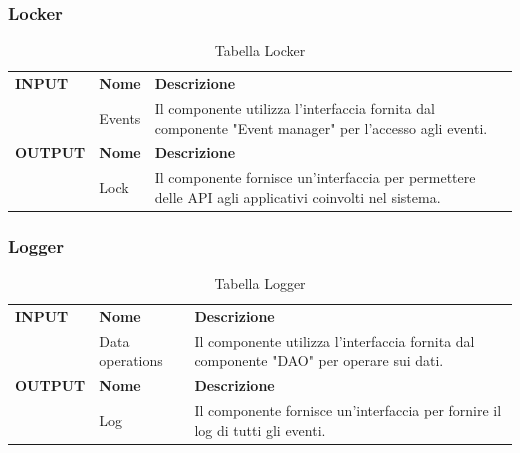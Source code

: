 \documentclass{article}
\begin{document}
\subsubsection{Locker}

\begin{table}[htbp]
    \centering
    \renewcommand{\arraystretch}{1.3} %
    \begin{tabularx}{\textwidth}{| l | l | X |}
        \Xhline{2pt}
        \textbf{INPUT} & \textbf{Nome} & \textbf{Descrizione} \\
        \Xhline{2pt}
         & Events & Il componente utilizza l'interfaccia fornita dal componente "Event manager" per l'accesso agli eventi. \\
        \Xhline{2pt}
        \textbf{OUTPUT} & \textbf{Nome} & \textbf{Descrizione} \\
        \Xhline{2pt}
         & Lock & Il componente fornisce un'interfaccia per permettere delle API agli applicativi coinvolti nel sistema. \\
        \hline
    \end{tabularx}
    \caption{Tabella Locker}
\end{table}

\clearpage

\subsubsection{Logger}

\begin{table}[htbp]
    \centering
    \renewcommand{\arraystretch}{1.3} %
    \begin{tabularx}{\textwidth}{| l | l | X |}
        \Xhline{2pt}
        \textbf{INPUT} & \textbf{Nome} & \textbf{Descrizione} \\
        \Xhline{2pt}
         & Data operations & Il componente utilizza l'interfaccia fornita dal componente "DAO" per operare sui dati. \\
        \Xhline{2pt}
        \textbf{OUTPUT} & \textbf{Nome} & \textbf{Descrizione} \\
        \Xhline{2pt}
         & Log & Il componente fornisce un'interfaccia per fornire il log di tutti gli eventi. \\
        \hline
    \end{tabularx}
    \caption{Tabella Logger}
\end{table}
\end{document}
